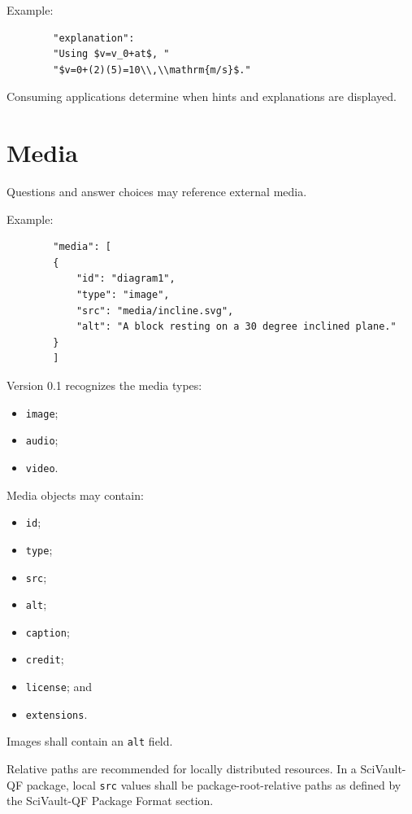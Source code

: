 \documentclass[11pt]{article}
\begin{document}
	Example:
	
	\begin{lstlisting}
		"explanation":
		"Using $v=v_0+at$, "
		"$v=0+(2)(5)=10\\,\\mathrm{m/s}$."
	\end{lstlisting}
	
	Consuming applications determine when hints and explanations are displayed.
	
	\section{Media}
	
	Questions and answer choices may reference external media.
	
	Example:
	
	\begin{lstlisting}
		"media": [
		{
			"id": "diagram1",
			"type": "image",
			"src": "media/incline.svg",
			"alt": "A block resting on a 30 degree inclined plane."
		}
		]
	\end{lstlisting}
	
	Version 0.1 recognizes the media types:
	
	\begin{itemize}
		\item \texttt{image};
		\item \texttt{audio};
		\item \texttt{video}.
	\end{itemize}
	
	Media objects may contain:
	
	\begin{itemize}
		\item \texttt{id};
		\item \texttt{type};
		\item \texttt{src};
		\item \texttt{alt};
		\item \texttt{caption};
		\item \texttt{credit};
		\item \texttt{license}; and
		\item \texttt{extensions}.
	\end{itemize}
	
	Images shall contain an \texttt{alt} field.
	
	Relative paths are recommended for locally distributed resources. In a
	SciVault-QF package, local \texttt{src} values shall be package-root-relative
	paths as defined by the SciVault-QF Package Format section.
	
\end{document}
